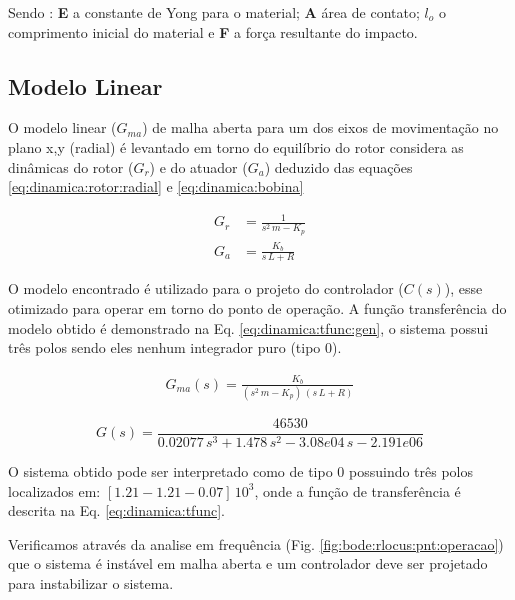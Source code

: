 Sendo : \textbf{E }a constante de Yong para o material; \textbf{A} área de contato; \textbf{$l_o$ } o comprimento inicial do material e \textbf{F} a força resultante do impacto. 


\subsection{Modelo Linear}
O modelo linear ($G_{ma}$) de malha aberta para um dos eixos de movimentação no plano x,y (radial) é levantado em torno do equilíbrio do rotor considera as dinâmicas do rotor ($G_r$) e do atuador ($G_a$) deduzido das equações  \eqref{eq:dinamica:rotor:radial} e \eqref{eq:dinamica:bobina}

\begin{align}
	G_r &= \frac{1}{s^2 \, m - K_p} \\
	G_a &= \frac{K_b}{s\, L + R}
\end{align}

O modelo encontrado é utilizado para o projeto do controlador ($C(s)$), esse otimizado para operar em torno do ponto de operação. A função transferência do modelo obtido é demonstrado na Eq. \eqref{eq:dinamica:tfunc:gen}, o sistema possui três polos sendo eles nenhum integrador puro (tipo 0). 

\begin{align}
	G_{ma}(s) = \frac{K_b}{(s^2 \, m - K_p) \, (s\, L + R)}
	\label{eq:dinamica:tfunc:gen}
\end{align}
 
 
 \begin{equation}
 G(s) = \frac{46530}{ 0.02077 \, s^3 + 1.478 \, s^2 - 3.08e04 \,s - 2.191e06}
 \label{eq:dinamica:tfunc}
 \end{equation}

O sistema obtido pode ser interpretado como de tipo 0 possuindo três polos localizados em:  $[1.21 -1.21 -0.07] \, 10^ 3$, onde a função de transferência é descrita na Eq. \eqref{eq:dinamica:tfunc}. 

Verificamos através da analise em frequência (Fig. \ref{fig:bode:rlocus:pnt:operacao}) que o sistema é instável em malha aberta e um controlador deve ser projetado para instabilizar o sistema. 


